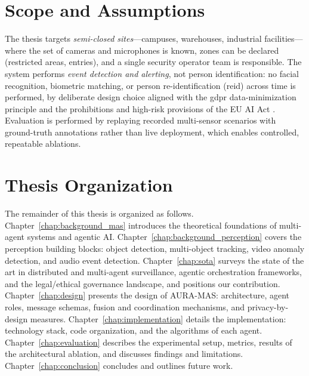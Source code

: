 \section{Scope and Assumptions}

The thesis targets \emph{semi-closed sites}---campuses, warehouses, industrial facilities---where the set of cameras and microphones is known, zones can be declared (restricted areas, entries), and a single security operator team is responsible. The system performs \emph{event detection and alerting}, not person identification: no facial recognition, biometric matching, or person re-identification (\gls{reid}) across time is performed, by deliberate design choice aligned with the \gls{gdpr} data-minimization principle \cite{gdpr2016} and the prohibitions and high-risk provisions of the EU AI Act \cite{euaiact2024}. Evaluation is performed by replaying recorded multi-sensor scenarios with ground-truth annotations rather than live deployment, which enables controlled, repeatable ablations.

\section{Thesis Organization}

The remainder of this thesis is organized as follows. Chapter~\ref{chap:background_mas} introduces the theoretical foundations of multi-agent systems and agentic AI. Chapter~\ref{chap:background_perception} covers the perception building blocks: object detection, multi-object tracking, video anomaly detection, and audio event detection. Chapter~\ref{chap:sota} surveys the state of the art in distributed and multi-agent surveillance, agentic orchestration frameworks, and the legal/ethical governance landscape, and positions our contribution. Chapter~\ref{chap:design} presents the design of AURA-MAS: architecture, agent roles, message schemas, fusion and coordination mechanisms, and privacy-by-design measures. Chapter~\ref{chap:implementation} details the implementation: technology stack, code organization, and the algorithms of each agent. Chapter~\ref{chap:evaluation} describes the experimental setup, metrics, results of the architectural ablation, and discusses findings and limitations. Chapter~\ref{chap:conclusion} concludes and outlines future work.
